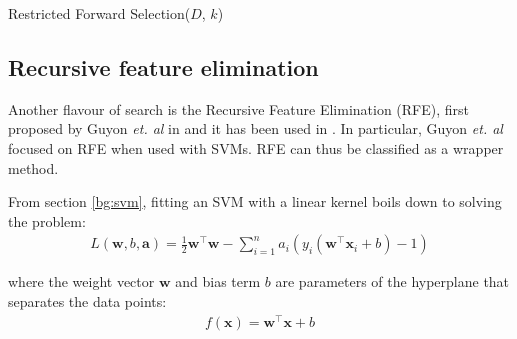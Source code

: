 \documentclass[12pt, twoside, a4paper]{report}
\def\vec{\boldsymbol}
\begin{document}
\begin{algorithm}
\DontPrintSemicolon
{}
\BlankLine
{}
\caption{Restricted Forward Selection($D$, $k$) \label{RFSAlgo}}
\end{algorithm}


\subsection{Recursive feature elimination} \label{bg:fs:rfe}
Another flavour of search is the Recursive Feature Elimination (RFE), first proposed by Guyon \textit{et. al} in \cite{RefWorks:228} and it has been used in \cite{RefWorks:229, RefWorks:230, RefWorks:231}. In particular, Guyon \textit{et. al} focused on RFE when used with SVMs. RFE can thus be classified as a wrapper method.

From section \ref{bg:svm}, fitting an SVM with a linear kernel boils down to solving the problem:
\begin{align*}
L(\boldsymbol w, b, \boldsymbol a)
= \frac{1}{2} \boldsymbol w^\top \boldsymbol w - \sum_{i=1}^n a_i (y_i(\boldsymbol w^\top \boldsymbol x_i + b) - 1)
\end{align*}

where the weight vector $\vec{w}$ and bias term $b$ are parameters of the hyperplane that separates the data points:
\begin{align*}
f(\vec{x}) = \vec{w}^\top \vec{x} + b
\end{align*}
\end{document}
